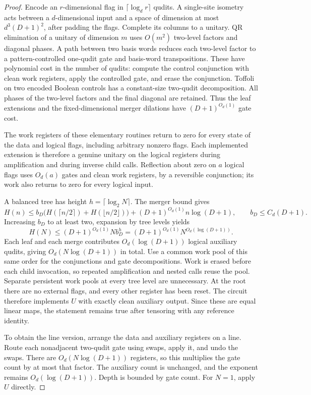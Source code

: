 \documentclass[11pt]{article}
\begin{document}
\begin{proof}
Encode an $r$-dimensional flag in $\lceil\log_d r\rceil$ qudits.
A single-site isometry acts between a $d$-dimensional input and
a space of dimension at most $d^3(D+1)^2$, after padding the flags.
Complete its columns to a unitary. QR elimination of a unitary of
dimension $m$ uses $O(m^2)$ two-level factors and diagonal phases.
A path between two basis words reduces each two-level factor to
a pattern-controlled one-qudit gate and basis-word transpositions.
These have polynomial cost in the number of qudits: compute the
control conjunction with clean work registers, apply the controlled
gate, and erase the conjunction. Toffoli on two encoded Boolean
controls has a constant-size two-qudit decomposition. All phases
of the two-level factors and the final diagonal are retained.
Thus the leaf extensions and the fixed-dimensional merger
dilations have $(D+1)^{O_d(1)}$ gate cost.

The work registers of these elementary routines return to zero
for every state of the data and logical flags, including arbitrary
nonzero flags. Each implemented extension is therefore a genuine
unitary on the logical registers during amplification and during
inverse child calls. Reflection about zero on $a$ logical flags
uses $O_d(a)$ gates and clean work registers, by a reversible
conjunction; its work also returns to zero for every logical input.

A balanced tree has height $h=\lceil\log_2N\rceil$. The merger
bound gives
\[
 H(n)\leq b_D\bigl(H(\lceil n/2\rceil)+H(\lfloor n/2\rfloor)\bigr)
           +(D+1)^{O_d(1)}n\log(D+1),
 \qquad b_D\leq C_d(D+1).
\]
Increasing $b_D$ to at least two, expansion by tree levels yields
\[
 H(N)\leq(D+1)^{O_d(1)}N b_D^h
          =(D+1)^{O_d(1)}N^{O_d(\log(D+1))}.
\]
Each leaf and each merge contributes $O_d(\log(D+1))$ logical
auxiliary qudits, giving $O_d(N\log(D+1))$ in total. Use a common
work pool of this same order for the conjunctions and gate
decompositions. Work is erased before each child invocation, so
repeated amplification and nested calls reuse the pool. Separate
persistent work pools at every tree level are unnecessary.
At the root there are no external flags, and every other register
has been reset. The circuit therefore implements $U$ with exactly
clean auxiliary output. Since these are equal linear maps, the
statement remains true after tensoring with any reference identity.

To obtain the line version, arrange the data and auxiliary registers
on a line. Route each nonadjacent two-qudit gate using swaps, apply
it, and undo the swaps. There are $O_d(N\log(D+1))$ registers, so
this multiplies the gate count by at most that factor. The auxiliary
count is unchanged, and the exponent remains $O_d(\log(D+1))$.
Depth is bounded by gate count. For $N=1$, apply $U$ directly.
\end{proof}
\end{document}
